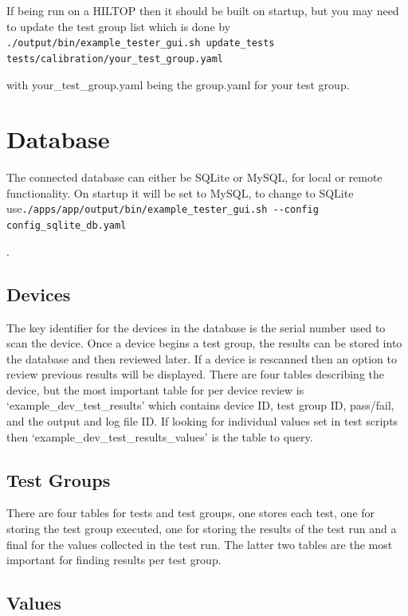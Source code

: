 \documentclass[a4paper,12pt, notitlepage]{article}
\begin{document}
{{{{{{{{{{{{{{{If being run on a HILTOP then it should be built on startup, but you may need to update the test group list which is done by \lstinline{./output/bin/example_tester_gui.sh update_tests tests/calibration/your_test_group.yaml}{ with your\_test\_group.yaml being the group.yaml for your test group.

\newpage
\section{Database}
\label{sec: Database}

The connected database can either be SQLite or MySQL, for local or remote functionality. On startup it will be set to MySQL, to change to SQLite use\newline \lstinline{./apps/app/output/bin/example_tester_gui.sh --config config_sqlite_db.yaml}{.

\subsection{Devices}
\label{ssec: devicesDatabase}

The key identifier for the devices in the database is the serial number used to scan the device. Once a device begins a test group, the results can be stored into the database and then reviewed later. If a device is rescanned then an option to review previous results will be displayed. There are four tables describing the device, but the most important table for per device review is `example\_dev\_test\_results' which contains device ID, test group ID, pass/fail, and the output and log file ID. If looking for individual values set in test scripts then `example\_dev\_test\_results\_values' is the table to query. 

\subsection{Test Groups}
\label{ssec: testsDatabase}

There are four tables for tests and test groups, one stores each test, one for storing the test group executed, one for storing the results of the test run and a final for the values collected in the test run. The latter two tables are the most important for finding results per test group. 

\subsection{Values}
\label{ssec: valuesDatabase}

}}}}}}}}}}}}}}}}}
\end{document}

